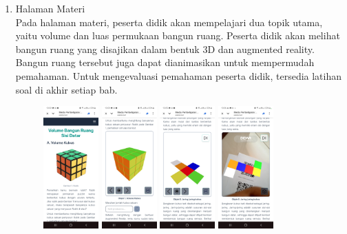 \documentclass[12pt]{article}
\begin{document}
\begin{enumerate}
    \item Halaman Materi\\
    \hspace*{1cm}Pada halaman materi, peserta didik akan mempelajari dua topik utama, yaitu volume dan luas permukaan bangun ruang. Peserta didik akan melihat bangun ruang yang disajikan dalam bentuk 3D dan augmented reality. Bangun ruang tersebut juga dapat dianimasikan untuk mempermudah pemahaman. Untuk mengevaluasi pemahaman peserta didik, tersedia latihan soal di akhir setiap bab.
    \begin{figure}[H]
        \centering
        \includegraphics[width=0.2\textwidth]{images/materi1.jpg}
        \includegraphics[width=0.2\textwidth]{images/materi2.jpg}
        \includegraphics[width=0.2\textwidth]{images/materi3.jpg}
        \includegraphics[width=0.2\textwidth]{images/materi4.jpg}

\end{figure}
\end{enumerate}
\end{document}
